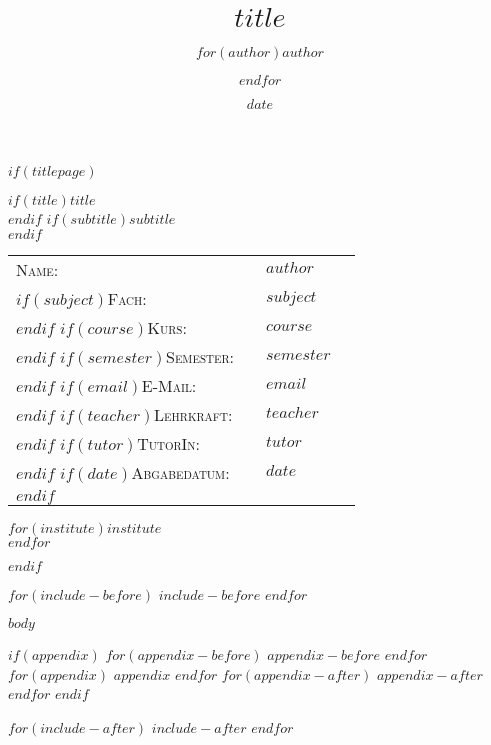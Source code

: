 \documentclass[$if(font-size)$$font-size$$else$12pt$endif$, $if(paper-format)$$paper-format$$else$a4paper$endif$]{article}
\title{$title$}
\author{$for(author)$$author$\and$endfor$}
\date{$date$}
\begin{document}
\onehalfspacing %

$if(titlepage)$
\pagestyle{plain}
\vspace*{2cm}

\begin{center}
  $if(title)${\huge $title$}\\[1cm]$endif$
  $if(subtitle)${\LARGE $subtitle$}\\[5cm]$endif$
\end{center}

\vspace*{2cm}

\begin{tabular}{p{3.5cm}|p{0.1cm} p{10cm}l}
  \textsc{Name:}                   &  & \textsc{$author$}   \\
  $if(subject)$\textsc{Fach:}      &  & \textsc{$subject$}  \\ $endif$
  $if(course)$\textsc{Kurs:}       &  & \textsc{$course$}   \\ $endif$
  $if(semester)$\textsc{Semester:} &  & \textsc{$semester$} \\ $endif$
  $if(email)$\textsc{E-Mail:}      &  & \textsc{$email$}    \\ $endif$
  $if(teacher)$\textsc{Lehrkraft:} &  & \textsc{$teacher$}  \\ $endif$
  $if(tutor)$\textsc{TutorIn:}     &  & \textsc{$tutor$}    \\ $endif$
  $if(date)$\textsc{Abgabedatum:}  &  & \textsc{$date$}     \\ $endif$
\end{tabular}

\vspace*{4cm}

\begin{center}
  $for(institute)$$institute$ \\$endfor$
\end{center}
\clearpage
\pagestyle{$if(pagestyle)$$pagestyle$$else$homework$endif$}
$endif$

$for(include-before)$
$include-before$
$endfor$

$body$

$if(appendix)$
$for(appendix-before)$
$appendix-before$
$endfor$
$for(appendix)$
$appendix$
$endfor$
$for(appendix-after)$
$appendix-after$
$endfor$
$endif$

$for(include-after)$
$include-after$
$endfor$
\end{document}

